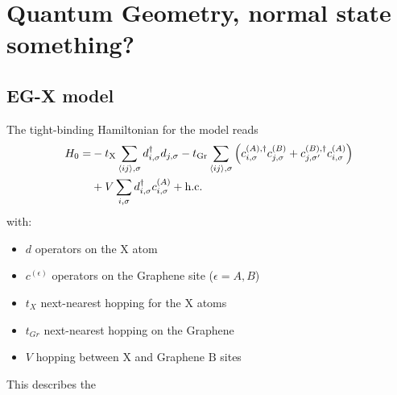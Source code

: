 \documentclass[../main.tex]{subfiles}
\begin{document}
\chapter{Quantum Geometry, normal state something?}

\section{EG-X model}

The tight-binding Hamiltonian for the model reads
\begin{align}
	H_0 = &-t_{\mathrm{X}} \sum_{\langle ij \rangle, \sigma} d_{i, \sigma}^{\dagger} d_{j, \sigma}
	-t_{\mathrm{Gr}} \sum_{\langle ij \rangle, \sigma} \left(
	c_{i, \sigma}^{(A), \dagger} c_{j, \sigma}^{(B)} +
	c_{j, \sigma^{\prime}}^{(B), \dagger} c_{i, \sigma}^{(A)} \right) \notag \\
	&+ V \sum_{i, \sigma} d_{i, \sigma}^{\dagger} c_{i, \sigma}^{(A)} + \mathrm{h.c.} \label{eq:EG-X model Hamiltonian non-interacting}
\end{align}
with:
\begin{itemize}
	\item \(d\) operators on the \(\mathrm{X}\) atom
	\item \(c^{(\epsilon)}\) operators on the Graphene site (\(\epsilon = A, B\))
	\item \(t_X\) next-nearest hopping for the \(\mathrm{X}\) atoms
	\item \(t_{Gr}\) next-nearest hopping on the Graphene
	\item \(V\) hopping between \(\mathrm{X}\) and Graphene \(\mathrm{B}\) sites
\end{itemize}
This describes the
\end{document}
